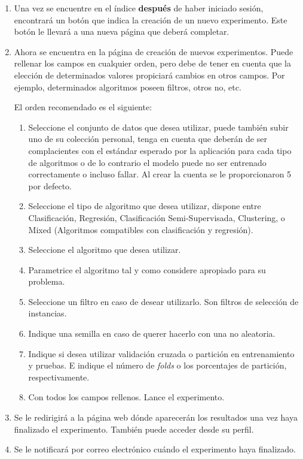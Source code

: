 \documentclass[
	12pt,
	spanish
]{article}
\begin{document}
\begin{enumerate}
\item Una vez se encuentre en el índice \textbf{después} de haber iniciado sesión, encontrará un botón que indica la creación de un nuevo experimento. Este botón le llevará a una nueva página que deberá completar.
\item Ahora se encuentra en la página de creación de nuevos experimentos. Puede rellenar los campos en cualquier orden, pero debe de tener en cuenta que la elección de determinados valores propiciará cambios en otros campos. Por ejemplo, determinados algoritmos poseen filtros, otros no, etc.

El orden recomendado es el siguiente:
\begin{enumerate}
\item Seleccione el conjunto de datos que desea utilizar, puede también subir uno de su colección personal, tenga en cuenta que deberán de ser complacientes con el estándar esperado por la aplicación para cada tipo de algoritmos o de lo contrario el modelo puede no ser entrenado correctamente o incluso fallar. Al crear la cuenta se le proporcionaron 5 por defecto.
\item Seleccione el tipo de algoritmo que desea utilizar, dispone entre Clasificación, Regresión, Clasificación Semi-Supervisada, Clustering, o Mixed (Algoritmos compatibles con clasificación y regresión).
\item Seleccione el algoritmo que desea utilizar.
\item Parametrice el algoritmo tal y como considere apropiado para su problema.
\item Seleccione un filtro en caso de desear utilizarlo. Son filtros de selección de instancias.
\item Indique una semilla en caso de querer hacerlo con una no aleatoria. 
\item Indique si desea utilizar validación cruzada o partición en entrenamiento y pruebas. E indique el número de \textit{folds} o los porcentajes de partición, respectivamente.
\item Con todos los campos rellenos. Lance el experimento.
\end{enumerate}
\item Se le redirigirá a la página web dónde aparecerán los resultados una vez haya finalizado el experimento. También puede acceder desde su perfil.
\item Se le notificará por correo electrónico cuándo el experimento haya finalizado.
\end{enumerate}
\end{document}
